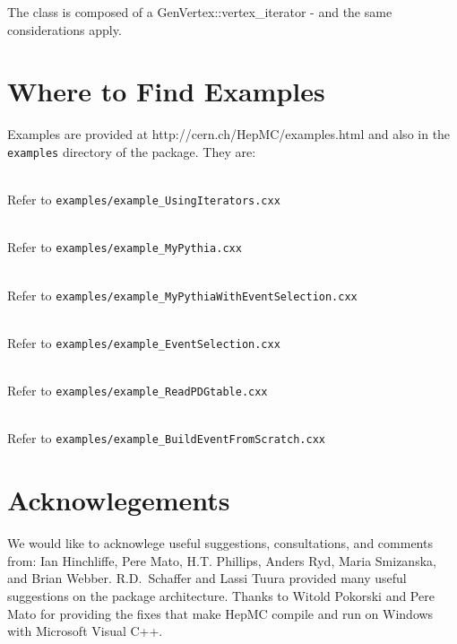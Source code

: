 \documentclass[11pt,letterpaper]{article}
\begin{document}
The class is composed of a GenVertex::vertex\_iterator - 
and the same considerations apply.

%
%

\section{Where to Find Examples}
\label{examples}

Examples are provided at 
{http://cern.ch/HepMC/examples.html} and also in the
\verb!examples! directory of the package. They are:

\begin{itemize}\setlength{\itemsep}{0pt}

   \\
  Refer to \verb!examples/example_UsingIterators.cxx!

   \\
  Refer to \verb!examples/example_MyPythia.cxx!

   \\
  Refer to \verb!examples/example_MyPythiaWithEventSelection.cxx!

   \\
  Refer to \verb!examples/example_EventSelection.cxx!

   \\
  Refer to \verb!examples/example_ReadPDGtable.cxx!

   \\
  Refer to \verb!examples/example_BuildEventFromScratch.cxx!

\end{itemize}
%
%

\section{Acknowlegements}

We would like to acknowlege useful suggestions, consultations, and
comments from: Ian Hinchliffe, Pere Mato, H.T. Phillips, Anders Ryd,
Maria Smizanska, and Brian Webber.  R.D.\ Schaffer and Lassi
Tuura provided many useful suggestions on the package architecture.
Thanks to Witold Pokorski and Pere Mato for providing the fixes that
make HepMC compile and run on Windows with Microsoft Visual C++.
\end{document}
